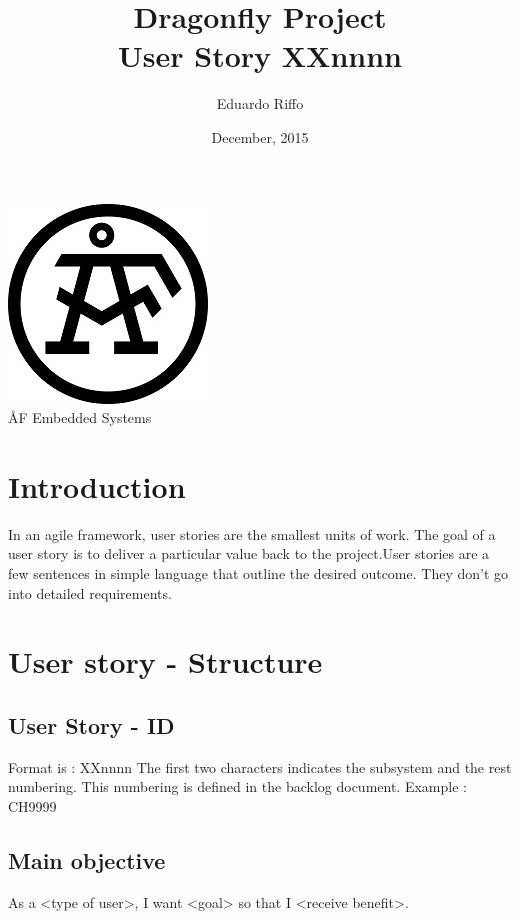 \documentclass[a4paper]{article}
\title{Dragonfly Project \\ User Story XXnnnn}
\author{Eduardo Riffo}
\date{December, 2015}         		%
\begin{document}

\maketitle                      		%

\begin{center}
\vspace{64pt}
\includegraphics[scale=1.6]{images/AF_Logotype20141_Black.png}
\vspace{16pt}
\\ \large ÅF Embedded Systems
\end{center}

\newpage

\tableofcontents				%

\newpage

\section{Introduction}

In an agile framework, user stories are the smallest units of work. The goal of a user story is to deliver a particular value back to the project.User stories are a few sentences in simple language that outline the desired outcome. They don't go into detailed requirements.

\section{User story - Structure}
	\subsection{User Story - ID}
	Format is : XXnnnn
	The first two characters indicates the subsystem and the rest numbering. This numbering is defined in the backlog document.
	Example : CH9999
	\subsection{Main objective}
	As a <type of user>, I want <goal> so that I <receive benefit>.
\end{document}
